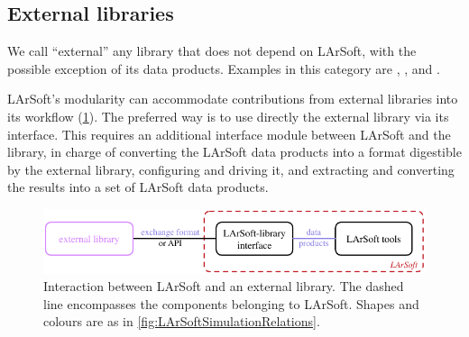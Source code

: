 \subsection{External libraries}
\label{ssec:Development:ExternalLibraries}

We call ``external'' any library that does not depend on LArSoft, with
the possible exception of its data products. Examples in this category
are \GENIE, \GEANT, and \Pandora.

LArSoft's modularity can accommodate contributions from external
libraries into its workflow (\cref{fig:LArSoftAndExternals}). The
preferred way is to use directly the external library via its interface.
This requires an additional interface module between LArSoft and the
library, in charge of converting the LArSoft data products into a format
digestible by the external library, configuring and driving it, and
extracting and converting the results into a set of LArSoft data
products.
\begin{figure}
   \centering
   \includegraphics{figures/LArSoftAndExternalLibrary}
   \caption[Interaction between LArSoft and an external library]{
      \label{fig:LArSoftAndExternals}
      Interaction between LArSoft and an external library.
      The dashed line encompasses the components belonging to LArSoft.
      Shapes and colours are as in \cref{fig:LArSoftSimulationRelations}.
   }
\end{figure}

